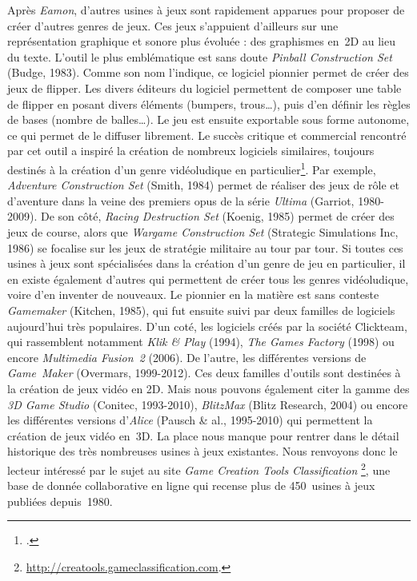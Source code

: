 \documentclass{FramateX}
\begin{document}
\begin{refsection}
Après \textit{Eamon}, d'autres usines à jeux
sont rapidement apparues pour proposer de créer d'autres genres de
jeux. Ces jeux s'appuient d'ailleurs sur une représentation graphique
et sonore plus évoluée : des graphismes en~2D au lieu du texte. L'outil
le plus emblématique est sans doute
\textit{Pinball Construction Set} (Budge, 1983). Comme son nom l'indique, ce logiciel pionnier permet de créer
des jeux de flipper. Les divers éditeurs du logiciel permettent de
composer une table de flipper en posant divers éléments (bumpers,
trous…), puis d'en définir les règles de bases (nombre de balles…). Le
jeu est ensuite exportable sous forme autonome, ce qui permet de le
diffuser librement. Le succès critique et commercial rencontré par cet
outil a inspiré la création de nombreux logiciels similaires, toujours
destinés à la création d'un genre vidéoludique en particulier\footnote{\cite{bartonhistory2010}.}. Par exemple,
\textit{Adventure Construction Set} (Smith,
1984) permet de réaliser des jeux de rôle et d'aventure dans la veine
des premiers opus de la série \textit{Ultima} (Garriot, 1980-2009). De son côté, \textit{
Racing Destruction Set} (Koenig, 1985) permet de créer des jeux de
course, alors que \textit{Wargame Construction Set} (Strategic Simulations Inc, 1986) se focalise sur les jeux de
stratégie militaire au tour par tour. Si toutes ces usines à jeux sont
spécialisées dans la création d'un genre de jeu en particulier, il en
existe également d'autres qui permettent de créer tous les genres
vidéoludique, voire d'en inventer de nouveaux. Le pionnier en la
matière est sans conteste \textit{Gamemaker} (Kitchen, 1985), qui fut ensuite suivi par deux familles de logiciels
aujourd'hui très populaires. D'un coté, les logiciels créés par la
société Clickteam, qui rassemblent notamment \textit{Klik \& Play} (1994),
\textit{The Games Factory} (1998) ou encore \textit{Multimedia Fusion~2} (2006). De
l'autre, les différentes versions de
\textit{Game~Maker} (Overmars, 1999-2012).
Ces deux familles d'outils sont destinées à la création de jeux vidéo
en 2D. Mais nous pouvons également citer la gamme des
\textit{3D Game Studio} (Conitec, 1993-2010),
\textit{BlitzMax} (Blitz Research, 2004) ou encore les différentes
versions d'\textit{Alice} (Pausch \& al., 1995-2010) qui permettent la création de jeux vidéo en~3D. La place
nous manque pour rentrer dans le détail historique des très nombreuses
usines à jeux existantes. Nous renvoyons donc le lecteur intéressé par
le sujet au site \textit{Game Creation Tools Classification} \footnote{\url{http://creatools.gameclassification.com}.},
une base de donnée collaborative en ligne qui recense plus de
450~usines à jeux publiées depuis~1980.



\end{refsection}
\end{document}
